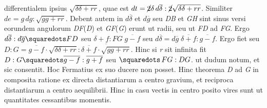 differentialem ipsius $\sqrt{\delta\delta+rr}$, quae est
%
%
$dt=\cancel{2}\delta\,d\overline{\delta}:\cancel{2}\sqrt{\delta\delta+rr}$.
\pend
\pstart
Similiter $de=g\,dg:\sqrt{gg+rr}$. Debent
autem
in
$d\overline{\delta}$ et $d\overline{g}$ seu \textit{DB} et \textit{GH} sint sinus versi eorundem angulorum \textit{DF}(\textit{D}) et \textit{GF}(\textit{G}) erunt ut radii, seu ut \textit{FD} ad \textit{FG}. Ergo $d\overline{\delta}:d\overline{g}\squaredots FD$ seu $\delta +f:FG\;\overline{g-f}$ seu $d\overline{\delta}=d\overline{g}\;\overline{\delta +f}:\overline{g-f}$. Ergo fiet
seu $D:G=\overline{g-f}\cdot\sqrt{\delta\delta+rr}:\overline{\overline{\delta +f}\cdot\sqrt{gg+rr}}$.
Hinc si \textit{r} sit infinita fit $D:G\squaredots \overline{g-f}:\overline{g+f}$ seu $\squaredots\,FG:DG$. ut dudum notum, et sic consentit. Hoc Fermatius ex suo ducere non posset. Hinc theorema
\textit{D} ad \textit{G} in composita ratione ex directa distantiarum a centro gravium, et reciproca distantiarum a centro aequilibrii. Hinc in casu vectis in centro posito vires sunt ut quantitates cessantibus momentis.
\pend
\normalsize		%
\vspace{0.5em}
\pstart
